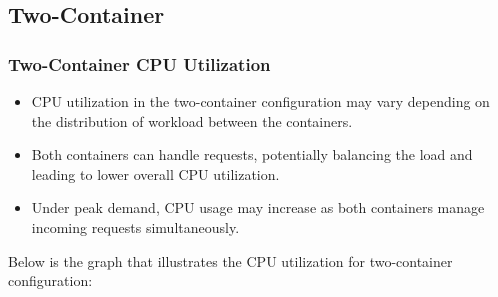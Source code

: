 \subsection{Two-Container}
\subsubsection{Two-Container CPU Utilization}
\begin{itemize}
    \item CPU utilization in the two-container configuration may vary depending on the distribution of workload between the containers.
    \item Both containers can handle requests, potentially balancing the load and leading to lower overall CPU utilization.
    \item Under peak demand, CPU usage may increase as both containers manage incoming requests simultaneously.
\end{itemize}

\noindent Below is the graph that illustrates the CPU utilization for two-container configuration:

